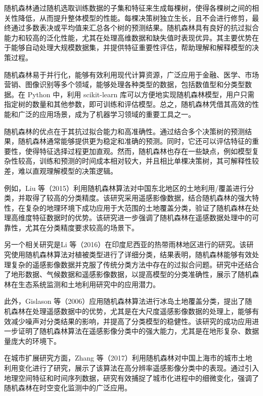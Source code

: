 \documentclass[AutoFakeBold]{LZUThesis-PgD&PhD}
\begin{document}
	随机森林通过随机选取训练数据的子集和特征来生成每棵树，使得各棵树之间的相关性降低，从而提升整体模型的性能。每棵决策树独立生长，且不会进行修剪，最终通过多数表决或平均值来汇总各个树的预测结果。随机森林具有良好的抗过拟合能力和较高的泛化性能，尤其在处理高维数据和缺失值时表现优异。其主要优势在于能够自动处理大规模数据集，并提供特征重要性评估，帮助理解和解释模型的决策过程。
	
	随机森林易于并行化，能够有效利用现代计算资源，广泛应用于金融、医学、市场营销、图像识别等多个领域，能够处理各种类型的数据，包括数值型和分类型数据。在 Python 中，利用 scikit-learn 库可以方便地实现随机森林模型，用户只需指定树的数量和其他参数，即可训练和评估模型。总之，随机森林凭借其高效的性能和广泛的应用场景，成为了机器学习领域的重要工具之一。
	
	随机森林的优点在于其抗过拟合能力和高准确性。通过结合多个决策树的预测结果，随机森林通常能够提供更为稳定和准确的预测。同时，它还可以评估特征的重要性，使得特征选择过程更加直观。然而，随机森林也存在一些缺点，例如模型复杂性较高，训练和预测的时间成本相对较大，并且相比单棵决策树，其可解释性较差，难以直观理解模型的决策逻辑。
	
	例如，Liu 等（2015）利用随机森林算法对中国东北地区的土地利用/覆盖进行分类，并取得了较高的分类精度。该研究采用遥感影像数据，结合随机森林的强大特性，在复杂的地理环境下成功应用于大范围的土地覆盖分类，验证了随机森林在处理高维度特征数据时的优势\cite{liu2015}。该研究进一步强调了随机森林在遥感数据处理中的可靠性，尤其在分类精度要求较高的场景下。
	
	另一个相关研究是Li 等（2016）在印度尼西亚的热带雨林地区进行的研究。该研究使用随机森林算法对植被类型进行了详细分类，结果表明，随机森林能够有效处理复杂的遥感影像数据并克服了传统分类方法中存在的过拟合问题\cite{li2016}。研究中还结合了地形数据、气候数据和遥感影像数据，以提高模型的分类准确性，展示了随机森林在生态系统监测和土地利用研究中的应用潜力。
	
	此外，Gislason 等（2006）应用随机森林算法进行冰岛土地覆盖分类，提出了随机森林在处理遥感数据中的优势，尤其是在大尺度遥感影像数据的处理上，能够有效减少噪声对分类结果的影响，并提高了分类模型的稳健性\cite{gislason2006}。该研究的成功应用进一步证明了随机森林算法在遥感影像分类中的强大能力，尤其是在地形复杂、数据量庞大的环境下。
	
	在城市扩展研究方面，Zhang 等（2017）利用随机森林对中国上海市的城市土地利用变化进行了研究，展示了该算法在高分辨率遥感影像分类中的表现\cite{zhang2017}。通过引入地理空间特征和时间序列数据，研究有效捕捉了城市化进程中的细微变化，强调了随机森林在时空变化监测中的广泛应用。
	
\end{document}
